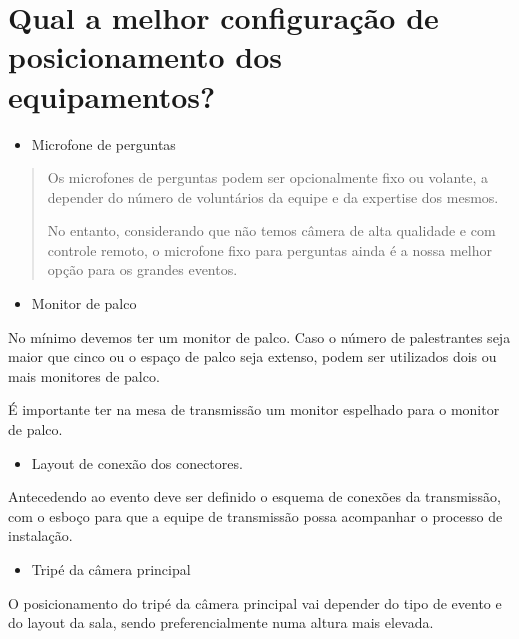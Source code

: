 \documentclass[
]{book}
\providecommand{\tightlist}{%
  \setlength{\itemsep}{0pt}\setlength{\parskip}{0pt}}
\begin{document}
\section{\texorpdfstring{\textbf{Qual a melhor configuração de
posicionamento dos
equipamentos?~}}{Qual a melhor configuração de posicionamento dos equipamentos?~}}\label{qual-a-melhor-configurauxe7uxe3o-de-posicionamento-dos-equipamentos}

\begin{itemize}
\tightlist
\item
  Microfone de perguntas
\end{itemize}

\begin{quote}
Os microfones de perguntas podem ser opcionalmente fixo ou volante, a
depender do número de voluntários da equipe e da expertise dos mesmos.

No entanto, considerando que não temos câmera de alta qualidade e com
controle remoto, o microfone fixo para perguntas ainda é a nossa melhor
opção para os grandes eventos.
\end{quote}

\begin{itemize}
\tightlist
\item
  Monitor de palco
\end{itemize}

No mínimo devemos ter um monitor de palco. Caso o número de palestrantes
seja maior que cinco ou o espaço de palco seja extenso, podem ser
utilizados dois ou mais monitores de palco.

É importante ter na mesa de transmissão um monitor espelhado para o
monitor de palco.~

\begin{itemize}
\tightlist
\item
  Layout de conexão dos conectores.~
\end{itemize}

Antecedendo ao evento deve ser definido o esquema de conexões da
transmissão, com o esboço para que a equipe de transmissão possa
acompanhar o processo de instalação.

\begin{itemize}
\tightlist
\item
  Tripé da câmera principal
\end{itemize}

O posicionamento do tripé da câmera principal vai depender do tipo de
evento e do layout da sala, sendo preferencialmente numa altura mais
elevada.~
\end{document}
